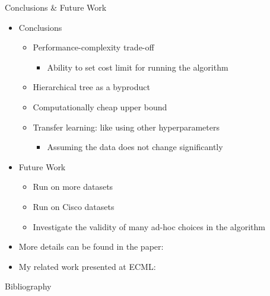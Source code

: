 \documentclass[10pt]{beamer}
\begin{document}
\begin{frame}{Conclusions \& Future Work}
    \begin{itemize}
        \item Conclusions
        \begin{itemize}
            \item Performance-complexity trade-off
            \begin{itemize}
                \item Ability to set cost limit for running the algorithm
            \end{itemize}
            \item Hierarchical tree as a byproduct
            \item Computationally cheap upper bound
            \item Transfer learning: like using other hyperparameters
            \begin{itemize}
                \item Assuming the data does not change significantly
            \end{itemize}
        \end{itemize}
        
        \item Future Work
        \begin{itemize}
            \item Run on more datasets
            \item Run on Cisco datasets
            \item Investigate the validity of many ad-hoc choices in the algorithm
        \end{itemize}
        
    \item More details can be found in the paper: \cite{prochazka_scalable_2022}
    \item My related work presented at ECML: \cite{dedic_adaptive_2022}
    \end{itemize}
\end{frame}

\begin{frame}[shrink=12]{Bibliography}
    \printbibliography
\end{frame}

\begin{frame}
    \titlepage
\end{frame}
\end{document}
